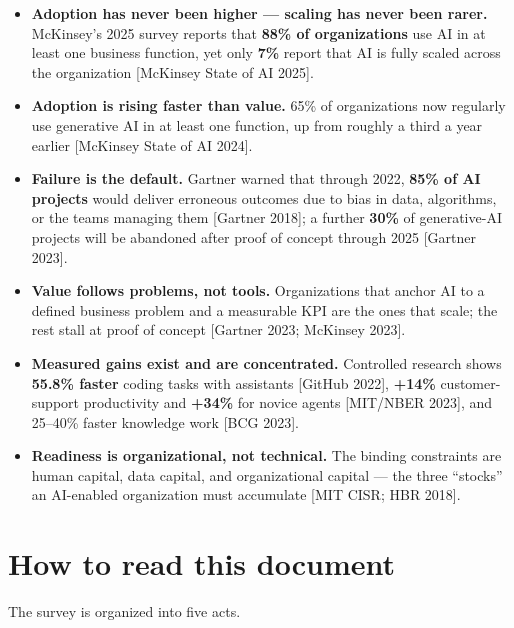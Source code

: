 \begin{itemize}
  \item \textbf{Adoption has never been higher — scaling has never been rarer.}
        McKinsey's 2025 survey reports that \textbf{88\% of organizations} use
        AI in at least one business function, yet only \textbf{7\%} report that
        AI is fully scaled across the organization [McKinsey State of AI 2025].
  \item \textbf{Adoption is rising faster than value.} 65\% of organizations now
        regularly use generative AI in at least one function, up from roughly a
        third a year earlier [McKinsey State of AI 2024].
  \item \textbf{Failure is the default.} Gartner warned that through 2022,
        \textbf{85\% of AI projects} would deliver erroneous outcomes due to
        bias in data, algorithms, or the teams managing them [Gartner 2018];
        a further \textbf{30\%} of generative-AI projects will be abandoned
        after proof of concept through 2025 [Gartner 2023].
  \item \textbf{Value follows problems, not tools.} Organizations that anchor
        AI to a defined business problem and a measurable KPI are the ones that
        scale; the rest stall at proof of concept [Gartner 2023; McKinsey 2023].
  \item \textbf{Measured gains exist and are concentrated.} Controlled research
        shows \textbf{55.8\% faster} coding tasks with assistants [GitHub
        2022], \textbf{+14\%} customer-support productivity and \textbf{+34\%}
        for novice agents [MIT/NBER 2023], and 25--40\% faster knowledge work
        [BCG 2023].
  \item \textbf{Readiness is organizational, not technical.} The binding
        constraints are human capital, data capital, and organizational capital
        — the three ``stocks'' an AI-enabled organization must accumulate
        [MIT CISR; HBR 2018].
\end{itemize}

\section{How to read this document}

The survey is organized into five acts.

